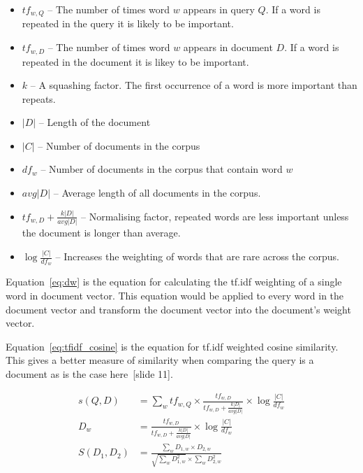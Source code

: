 \begin{itemize}
    \item $tf_{w,Q}$ -- The number of times word $w$ appears in query $Q$.  If a word is repeated in the query it is likely to be important.
    \item $tf_{w,D}$ -- The number of times word $w$ appears in document $D$.  If a word is repeated in the document it is likey to be important.
    \item $k$ -- A squashing factor.  The first occurrence of a word is more important than repeats.
    \item $|D|$ -- Length of the document
    \item $|C|$ -- Number of documents in the corpus
    \item $df_{w}$ -- Number of documents in the corpus that contain word $w$
    \item $avg|D|$ -- Average length of all documents in the corpus.
    \item $tf_{w,D} + \frac{k|D|}{avg|D|}$ -- Normalising factor, repeated words are less important unless the document is longer than average.
    \item $\log \frac{|C|}{df_{w}}$ -- Increases the weighting of words that are rare across the corpus.
\end{itemize}

Equation~\ref{eq:dw} is the equation for calculating the \ac{tf.idf} weighting of a single word in document vector.  This equation would be applied to every word in the document vector and transform the document vector into the document's weight vector.

Equation~\ref{eq:tfidf_cosine} is the equation for \ac{tf.idf} weighted cosine similarity.  This gives a better measure of similarity when comparing the query is a document as is the case here~\cite{tts_slides}[slide 11].

\begin{subequations}
    \begin{align}
    s(Q, D) &= \sum_{w} tf_{w,Q} \times \frac{tf_{w,D}}{tf_{w,D} + \frac{k|D|}{avg|D|}} \times \log{\frac{|C|}{df_{w}}} \label{eq:tfidf}\\[6pt]
    D_{w} &= \frac{tf_{w,D}}{tf_{w,D} + \frac{k|D|}{avg|D|}} \times \log{\frac{|C|}{df_{w}}} \label{eq:dw}\\[6pt]
    S(D_{1}, D_{2}) &= \frac{\sum_{w} D_{1,w} \times D_{2,w}}{\sqrt{\sum_{w} D_{1,w}^2} \times \sum_{w} D_{2,w}^2} \label{eq:tfidf_cosine}
    \end{align}
\end{subequations}

